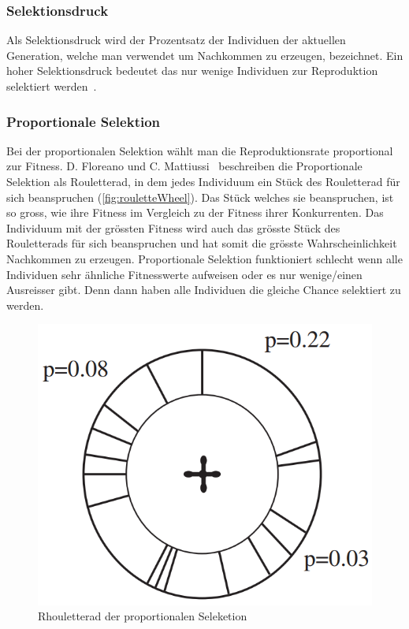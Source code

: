       \subsubsection{Selektionsdruck}

        Als Selektionsdruck wird der Prozentsatz der Individuen der aktuellen Generation,
        welche man verwendet um Nachkommen zu erzeugen, bezeichnet.
        Ein hoher Selektionsdruck bedeutet das nur wenige Individuen zur Reproduktion selektiert werden~\cite[S.23]{book:bioInspired}.

      \subsubsection{Proportionale Selektion}

        Bei der proportionalen Selektion wählt man die Reproduktionsrate proportional zur Fitness.
        D. Floreano und C. Mattiussi~\cite[S.23]{book:bioInspired} beschreiben die Proportionale Selektion als Rouletterad,
        in dem jedes Individuum ein Stück des Rouletterad für sich beanspruchen (\vref{fig:rouletteWheel}).
        Das Stück welches sie beanspruchen, ist so gross, wie ihre Fitness im Vergleich zu der Fitness ihrer Konkurrenten.
        Das Individuum mit der grössten Fitness wird auch das grösste Stück des Rouletterads für sich beanspruchen und hat somit die grösste Wahrscheinlichkeit Nachkommen zu erzeugen.
        Proportionale Selektion funktioniert schlecht wenn alle Individuen sehr ähnliche Fitnesswerte aufweisen oder es nur wenige/einen Ausreisser gibt.
        Denn dann haben alle Individuen die gleiche Chance selektiert zu werden.

        \begin{center}
          \begin{figure}[H]
            \includegraphics[scale=0.4]{graphics/roulettewheel}
            \caption{Rhouletterad der proportionalen Seleketion \cite[S.24]{book:bioInspired} \label{fig:rouletteWheel}}
          \end{figure}
        \end{center}

